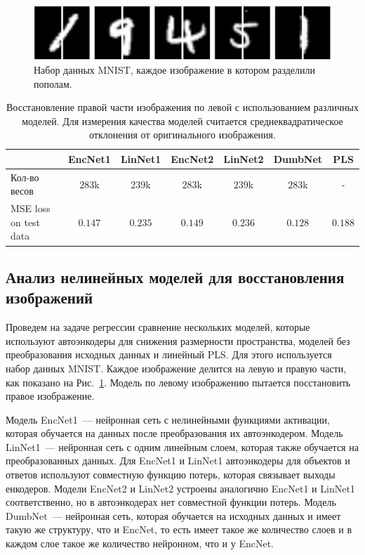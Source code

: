 \documentclass[12pt]{article}
\begin{document}
	
	\begin{figure}[h!]
		\begin{center}
			\includegraphics[width=\linewidth]{figures/left_right_mnist}
		\end{center}
		\caption{Набор данных MNIST, каждое изображение в котором разделили пополам.}
		\label{fgr:3}
	\end{figure}
	
	
	\begin{table}[h!]
		\caption{Восстановление правой части изображения по левой с использованием различных моделей. Для измерения качества моделей считается среднеквадратическое отклонения от оригинального изображения.
		}
		\centering
		\begin{tabular}{l|cccccc}
			\hline
			& EncNet1 & LinNet1 & EncNet2 & LinNet2 & DumbNet & PLS\\  \hline
			Кол-во весов & $283$k & $239$k & $283$k & $239$k  & $283$k & -\\ 
			MSE loss on test data & $0.147$ & $ 0.235$ & $0.149$ & $0.236$ & $0.128$ & $0.188$ \\ 
			\hline
		\end{tabular}
		\label{tbl:2}
	\end{table}
	
	\subsection{Анализ нелинейных моделей для восстановления изображений}
	
	Проведем на задаче регрессии сравнение нескольких моделей, которые используют автоэнкодеры для снижения размерности пространства, моделей без преобразования исходных данных и линейный PLS. Для этого используется набор данных MNIST. Каждое изображение делится на левую и правую части, как показано на Рис.~\ref{fgr:3}. Модель по левому изображению пытается посстановить правое изображение.
	
	Модель EncNet1~--- нейронная сеть с нелинейными функциями активации, которая обучается на данных после преобразования их автоэнкодером. Модель LinNet1~--- нейронная сеть с одним линейным слоем, которая также обучается на преобразованных данных. Для EncNet1 и LinNet1 автоэнкодеры для объектов и ответов используют совместную функцию потерь, которая связывает выходы енкодеров. Модели EncNet2 и LinNet2 устроены аналогично EncNet1 и LinNet1 соответственно, но в автоэнкодерах нет совместной функции потерь. Модель DumbNet~---  нейронная сеть, которая обучается на исходных данных и имеет такую же структуру, что и EncNet, то есть имеет такое же количество слоев и в каждом слое такое же количество нейронном, что и у EncNet.
	
\end{document}
